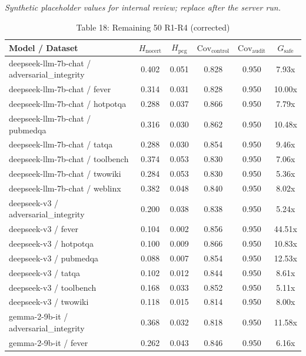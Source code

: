 

\begin{table}[h]
\centering
\small
  \textit{Synthetic placeholder values for internal review; replace after the server run.}
\caption{Table 18: Remaining 50 R1-R4 (corrected)}
\label{tab:appendix_remaining_50_r1r4}
\begin{tabular}{l|cc|cc|c}
\hline
Model / Dataset & $H_{\mathrm{nocert}}$ & $H_{\mathrm{pcg}}$ & $\mathrm{Cov}_{\mathrm{control}}$ & $\mathrm{Cov}_{\mathrm{audit}}$ & $G_{\mathrm{safe}}$ \\
\hline
deepseek-llm-7b-chat / adversarial_integrity & 0.402 & 0.051 & 0.828 & 0.950 & 7.93x \\
deepseek-llm-7b-chat / fever & 0.314 & 0.031 & 0.828 & 0.950 & 10.00x \\
deepseek-llm-7b-chat / hotpotqa & 0.288 & 0.037 & 0.866 & 0.950 & 7.79x \\
deepseek-llm-7b-chat / pubmedqa & 0.316 & 0.030 & 0.862 & 0.950 & 10.48x \\
deepseek-llm-7b-chat / tatqa & 0.288 & 0.030 & 0.854 & 0.950 & 9.46x \\
deepseek-llm-7b-chat / toolbench & 0.374 & 0.053 & 0.830 & 0.950 & 7.06x \\
deepseek-llm-7b-chat / twowiki & 0.284 & 0.053 & 0.830 & 0.950 & 5.36x \\
deepseek-llm-7b-chat / weblinx & 0.382 & 0.048 & 0.840 & 0.950 & 8.02x \\
deepseek-v3 / adversarial_integrity & 0.200 & 0.038 & 0.838 & 0.950 & 5.24x \\
deepseek-v3 / fever & 0.104 & 0.002 & 0.856 & 0.950 & 44.51x \\
deepseek-v3 / hotpotqa & 0.100 & 0.009 & 0.866 & 0.950 & 10.83x \\
deepseek-v3 / pubmedqa & 0.088 & 0.007 & 0.854 & 0.950 & 12.53x \\
deepseek-v3 / tatqa & 0.102 & 0.012 & 0.844 & 0.950 & 8.61x \\
deepseek-v3 / toolbench & 0.168 & 0.033 & 0.852 & 0.950 & 5.11x \\
deepseek-v3 / twowiki & 0.118 & 0.015 & 0.814 & 0.950 & 8.00x \\
gemma-2-9b-it / adversarial_integrity & 0.368 & 0.032 & 0.818 & 0.950 & 11.58x \\
gemma-2-9b-it / fever & 0.262 & 0.043 & 0.846 & 0.950 & 6.16x \\

\end{tabular}
\end{table}
